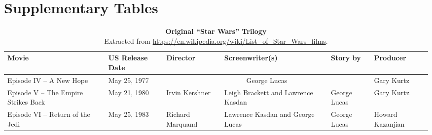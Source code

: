 
\onecolumn %
\fancyhead{} %
\renewcommand{\floatpagefraction}{0.1}
\lfoot[\bSupInf]{\dAuthor}
\rfoot[\dAuthor]{\cSupInf}
\newpage

\captionsetup*{format=largeformat} %
\setcounter{table}{0} %
\makeatletter 
\renewcommand{\thetable}{S\@arabic\c@table} %
\makeatother

\newpage
\section*{Supplementary Tables}

\bigskip

\begin{table}[!h]
    \centering
    \small
    \begin{tabular}{p{3cm}|p{2.2cm} p{2.2cm} p{2.2cm} p{2.2cm} p{2.2cm}}
        Movie & US Release Date & Director & Screenwriter(s) & Story by & Producer\\
        \hline
        Episode IV – A New Hope & May 25, 1977 & \multicolumn{3}{c}{George Lucas} & Gary Kurtz\\
        Episode V – The Empire Strikes Back & May 21, 1980 & Irvin Kershner & Leigh Brackett and Lawrence Kasdan & George Lucas & Gary Kurtz\\
        Episode VI – Return of the Jedi & May 25, 1983 & Richard Marquand & Lawrence Kasdan and George Lucas & George Lucas & Howard Kazanjian\\
    \end{tabular}
    \caption{\textbf{Original ``Star Wars'' Trilogy}\\
    Extracted from \url{https://en.wikipedia.org/wiki/List_of_Star_Wars_films}.}
    \label{supptab:st1}
\end{table}



